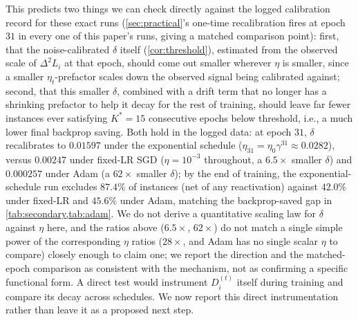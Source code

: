 \documentclass{article}
\theoremstyle{plain}
\theoremstyle{definition}
\theoremstyle{remark}
\begin{document}
This predicts two things we can check directly against the logged calibration record for these exact runs (\cref{sec:practical}'s one-time recalibration fires at epoch $31$ in every one of this paper's runs, giving a matched comparison point): first, that the noise-calibrated $\delta$ itself (\cref{cor:threshold}), estimated from the observed scale of $\Delta^2 L_i$ at that epoch, should come out smaller wherever $\eta$ is smaller, since a smaller $\eta_t$-prefactor scales down the observed signal being calibrated against; second, that this smaller $\delta$, combined with a drift term that no longer has a shrinking prefactor to help it decay for the rest of training, should leave far fewer instances ever satisfying $K^*{=}15$ consecutive epochs below threshold, i.e., a much lower final backprop saving. Both hold in the logged data: at epoch $31$, $\delta$ recalibrates to $0.01597$ under the exponential schedule ($\eta_{31}=\eta_0\gamma^{31}\approx0.0282$), versus $0.00247$ under fixed-LR SGD ($\eta{=}10^{-3}$ throughout, a $6.5\times$ smaller $\delta$) and $0.000257$ under Adam (a $62\times$ smaller $\delta$); by the end of training, the exponential-schedule run excludes $87.4\%$ of instances (net of any reactivation) against $42.0\%$ under fixed-LR and $45.6\%$ under Adam, matching the backprop-saved gap in \cref{tab:secondary,tab:adam}. We do not derive a quantitative scaling law for $\delta$ against $\eta$ here, and the ratios above ($6.5\times$, $62\times$) do not match a single simple power of the corresponding $\eta$ ratios ($28\times$, and Adam has no single scalar $\eta$ to compare) closely enough to claim one; we report the direction and the matched-epoch comparison as consistent with the mechanism, not as confirming a specific functional form. A direct test would instrument $D_i^{(t)}$ itself during training and compare its decay across schedules. We now report this direct instrumentation rather than leave it as a proposed next step.
\end{document}

